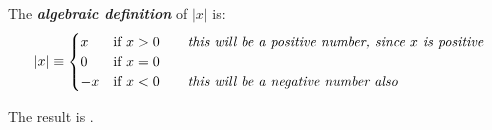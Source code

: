 \begin{center}
    \begin{tcolorbox}[width=5in]
    The {\bfseries\itshape algebraic definition} of $|x|$ is:
    \[ 
        |x| \equiv
        \begin{cases} 
            x &  \text{if } x>0 \qquad\text{\itshape this will be a positive number, since $x$ is positive}\\
            0 &  \text{if } x=0 \\
            -x & \text{if } x<0 \qquad\text{\itshape this will be a negative number also}
        \end{cases}
    \]
    
    The result is .
    \end{tcolorbox}
\end{center}
